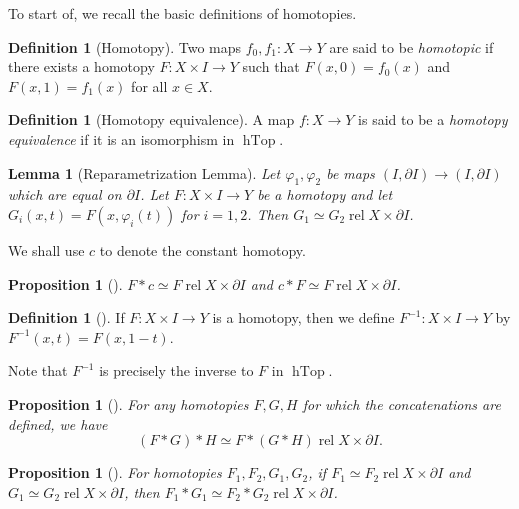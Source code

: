 \documentclass[reqno]{amsart}
\newtheorem{lemma}[theorem]{Lemma}
\newtheorem{proposition}[theorem]{Proposition}
\theoremstyle{definition}
\newtheorem{definition}[theorem]{Definition}
\theoremstyle{remark}
\DeclareMathOperator{\hTop}{hTop}
\DeclareMathOperator{\rel}{rel}
\begin{document}
To start of, we recall the basic definitions of homotopies.

\begin{definition}[Homotopy]
    Two maps $f_0, f_1 \colon X \to Y$ are said to
    be \textit{homotopic} if there exists a homotopy
    $F \colon X \times I \to Y$ such that
    $F(x,0) = f_0(x)$ and $F(x,1) = f_1(x)$ for
    all $x \in X$.
\end{definition}

\begin{definition}[Homotopy equivalence]
    A map $f \colon X \to Y$ is said to be a \textit{homotopy
    equivalence} if it is an isomorphism in
    $\hTop$.
\end{definition}

\begin{lemma}[Reparametrization Lemma]
    Let $\varphi_1, \varphi_2$ be maps
    $\left( I, \partial I \right) \to 
    \left( I, \partial I \right) $ which are equal on
    $\partial I$. Let
    $F \colon X \times I \to Y$ be a homotopy and let
    $G_i (x,t) = F\left( x, \varphi_i(t) \right) $ for
    $i = 1,2$. Then $G_1 \simeq G_2 \rel
    X \times \partial I$.
\end{lemma}

We shall use $c$ to denote the constant homotopy.

\begin{proposition}[]
    $F * c \simeq F \rel X \times \partial I$ and
    $c * F \simeq F \rel X \times \partial I$.
\end{proposition}

\begin{definition}[]
    If $F \colon X \times I \to Y$ is a homotopy, then we
    define $F^{-1} \colon X \times I \to Y$ by
    $F^{-1}\left( x,t \right) = F(x,1-t)$. 
\end{definition}

Note that $F^{-1}$ is precisely the inverse
to $F$ in $\hTop$.

\begin{proposition}[]
    For any homotopies $F,G,H$ for which the
    concatenations 
     are defined, we have
     \[
         \left( F * G  \right) * H
         \simeq F * \left( G * H \right) 
         \rel X \times \partial I.
     \] 
\end{proposition}


\begin{proposition}[]
    For homotopies $F_1, F_2, G_1, G_2$,
    if $F_1 \simeq F_2 \rel X \times \partial I$ and
    $G_1 \simeq G_2 \rel X \times \partial I$, then
    $F_1 * G_1 \simeq F_2 * G_2 \rel X \times \partial I$.
\end{proposition}
\end{document}
